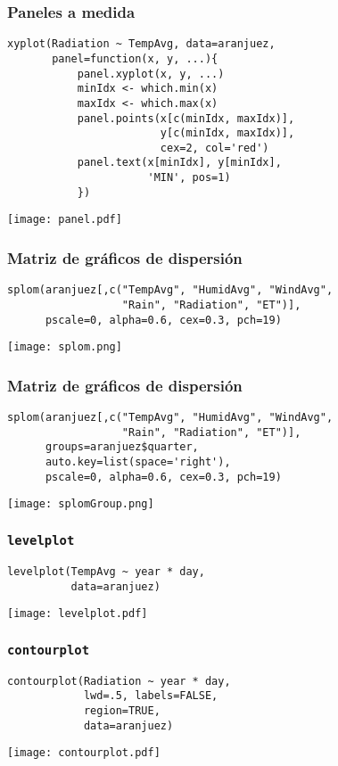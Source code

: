 \documentclass[xcolor={usenames,svgnames,dvipsnames}]{beamer}
\begin{document}
\begin{frame}[fragile]
\frametitle{Paneles a medida}
\label{sec-2-1-15}


\lstset{language=R}
\begin{lstlisting}
xyplot(Radiation ~ TempAvg, data=aranjuez,
       panel=function(x, y, ...){
           panel.xyplot(x, y, ...)
           minIdx <- which.min(x)
           maxIdx <- which.max(x)
           panel.points(x[c(minIdx, maxIdx)],
                        y[c(minIdx, maxIdx)],
                        cex=2, col='red')
           panel.text(x[minIdx], y[minIdx],
                      'MIN', pos=1)
           })
\end{lstlisting}

\texttt{[image: panel.pdf]}
\end{frame}
\begin{frame}[fragile]
\frametitle{Matriz de gráficos de dispersión}
\label{sec-2-1-16}


\lstset{language=R}
\begin{lstlisting}
splom(aranjuez[,c("TempAvg", "HumidAvg", "WindAvg",
                  "Rain", "Radiation", "ET")],
      pscale=0, alpha=0.6, cex=0.3, pch=19)
\end{lstlisting}

\texttt{[image: splom.png]}
\end{frame}
\begin{frame}[fragile]
\frametitle{Matriz de gráficos de dispersión}
\label{sec-2-1-17}


\lstset{language=R}
\begin{lstlisting}
splom(aranjuez[,c("TempAvg", "HumidAvg", "WindAvg",
                  "Rain", "Radiation", "ET")],
      groups=aranjuez$quarter,
      auto.key=list(space='right'),
      pscale=0, alpha=0.6, cex=0.3, pch=19)
\end{lstlisting}

\texttt{[image: splomGroup.png]}
\end{frame}
\begin{frame}[fragile]
\frametitle{\texttt{levelplot}}
\label{sec-2-1-18}


\lstset{language=R}
\begin{lstlisting}
levelplot(TempAvg ~ year * day,
          data=aranjuez)
\end{lstlisting}

\texttt{[image: levelplot.pdf]}
\end{frame}
\begin{frame}[fragile]
\frametitle{\texttt{contourplot}}
\label{sec-2-1-19}


\lstset{language=R}
\begin{lstlisting}
contourplot(Radiation ~ year * day,
            lwd=.5, labels=FALSE,
            region=TRUE, 
            data=aranjuez)
\end{lstlisting}

\texttt{[image: contourplot.pdf]}
\end{frame}
\end{document}
